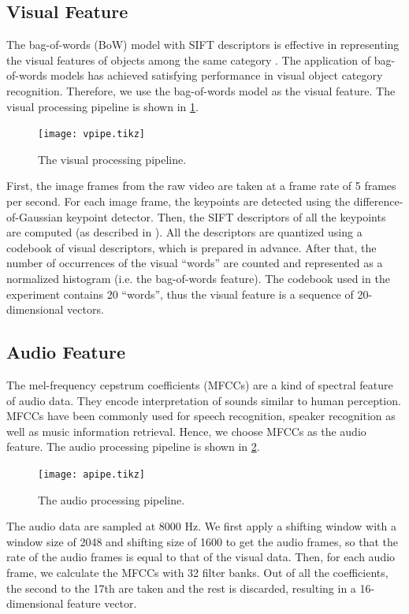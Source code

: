 \documentclass[letterpaper, 10 pt, conference]{ieeeconf}
\begin{document}
\subsection{Visual Feature}
The bag-of-words (BoW) model with SIFT descriptors is effective in representing the visual features of objects among the same category \cite{csurka_visual_2004,sivic_discovering_2005}. The application of bag-of-words models has achieved satisfying performance in visual object category recognition. Therefore, we use the bag-of-words model as the visual feature. The visual processing pipeline is shown in \cref{fig:vpipe}.

\begin{figure}[t]
  \footnotesize
  \centering
  \texttt{[image: vpipe.tikz]}
  \caption{The visual processing pipeline.}
  \label{fig:vpipe}
\end{figure}

First, the image frames from the raw video are taken at a  frame rate of 5 frames per second. For each image frame, the keypoints are detected using the difference-of-Gaussian keypoint detector. Then, the SIFT descriptors of all the keypoints are computed (as described in \cite{lowe_distinctive_2004}). All the descriptors are quantized using a codebook of visual descriptors, which is prepared in advance. After that, the number of occurrences of the visual ``words'' are counted and represented as a normalized histogram (i.e. the bag-of-words feature). The codebook used in the experiment contains 20 ``words'', thus the visual feature is a sequence of 20-dimensional vectors.

\subsection{Audio Feature}
The mel-frequency cepstrum coefficients (MFCCs) are a kind of spectral feature of audio data. They encode interpretation of sounds similar to human perception. MFCCs have been commonly used for speech recognition, speaker recognition as well as music information retrieval. Hence, we choose MFCCs as the audio feature. The audio processing pipeline is shown in \cref{fig:apipe}.

\begin{figure}[t]
  \footnotesize
  \centering
  \texttt{[image: apipe.tikz]}
  \caption{The audio processing pipeline.}
  \label{fig:apipe}
\end{figure}

The audio data are sampled at 8000 Hz. We first apply a shifting window with a window size of 2048 and shifting size of 1600 to get the audio frames, so that the rate of the audio frames is equal to that of the visual data. Then, for each audio frame, we calculate the MFCCs with 32 filter banks. Out of all the coefficients, the second to the 17th are taken and the rest is discarded, resulting in a 16-dimensional feature vector.
\end{document}
